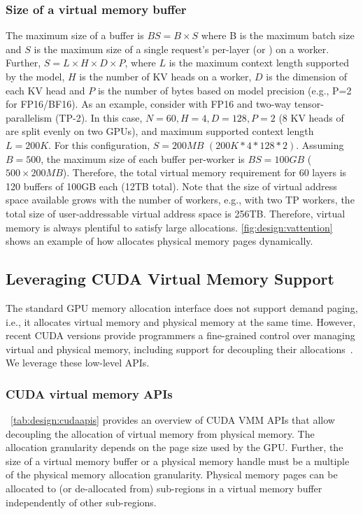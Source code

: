 \subsubsection{Size of a virtual memory buffer}
\label{sec:design:buffersize}
The maximum size of a buffer is $BS=B\times S$ where B is the maximum batch size and $S$ is the maximum size of a single request's per-layer \kcache (or \vcache) on a worker. Further, $S=L\times H\times D\times P$, where $L$ is the maximum context length supported by the model, $H$ is the number of KV heads on a worker, $D$ is the dimension of each KV head and $P$ is the number of bytes based on model precision (e.g., P=2 for FP16/BF16).  As an example, consider \yimedium with FP16 and two-way tensor-parallelism (TP-2). In this case, $N\!=\!60, H=4, D=128, P=2$ (8 KV heads of \yimedium are split evenly on two GPUs), and maximum supported context length $L=200K$. For this configuration, $S=200MB$ $(200K*4*128*2)$. Assuming $B=500$, the maximum size of each buffer per-worker is $BS=100GB$ ($500\times 200MB$). Therefore, the total virtual memory requirement for 60 layers is 120 buffers of 100GB each (12TB total). Note that the size of virtual address space available grows with the number of workers, e.g., with two TP workers, the total size of user-addressable virtual address space is 256TB. Therefore, virtual memory is always plentiful to satisfy large allocations. \autoref{fig:design:vattention} shows an example of how \sysname allocates physical memory pages dynamically.



\subsection{Leveraging CUDA Virtual Memory Support}

The standard GPU memory allocation interface \cudamalloc does not support demand paging, i.e., it allocates virtual memory and physical memory at the same time. However, recent CUDA versions provide programmers a fine-grained control over managing virtual and physical memory, including support for decoupling their allocations~\cite{cudavirtualmemory, gmlakeasplos24}. We leverage these low-level APIs.

\subsubsection{CUDA virtual memory APIs}~\autoref{tab:design:cudaapis} provides an overview of CUDA VMM APIs that allow decoupling the allocation of virtual memory from physical memory. The allocation granularity depends on the page size used by the GPU. Further, the size of a virtual memory buffer or a physical memory handle must be a multiple of the physical memory allocation granularity.  Physical memory pages can be allocated to (or de-allocated from) sub-regions in a virtual memory buffer independently of other sub-regions. 

